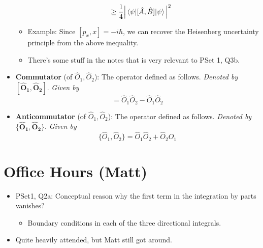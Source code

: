 \documentclass[../notes.tex]{subfiles}
\begin{document}
\begin{itemize}
\begin{itemize}
\begin{align*}
            &\geq \frac{1}{4}\Big| \ev{[\hat{A},\hat{B}]}{\psi} \Big|^2
        \end{align*}
        \item Example: Since $[p_x,x]=-i\hbar$, we can recover the Heisenberg uncertainty principle from the above inequality.
        \item There's some stuff in the notes that is very relevant to PSet 1, Q3b.
    \end{itemize}
    \item \textbf{Commutator} (of $\hat{O}_1,\hat{O}_2$): The operator defined as follows. \emph{Denoted by} $\bm{[\hat{O}_1,\hat{O}_2]}$. \emph{Given by}
    \begin{equation*}
        [\hat{O}_1,\hat{O}_2] = \hat{O}_1\hat{O}_2-\hat{O}_1\hat{O}_2
    \end{equation*}
    \item \textbf{Anticommutator} (of $\hat{O}_1,\hat{O}_2$): The operator defined as follows. \emph{Denoted by} $\bm{\{\hat{O}_1,\hat{O}_2\}}$. \emph{Given by}
    \begin{equation*}
        \{\hat{O}_1,\hat{O}_2\} = \hat{O}_1\hat{O}_2+\hat{O}_2\hat{O}_1
    \end{equation*}
\end{itemize}



\section{Office Hours (Matt)}
\begin{itemize}
    \item PSet1, Q2a: Conceptual reason why the first term in the integration by parts vanishes?
    \begin{itemize}
        \item Boundary conditions in each of the three directional integrals.
    \end{itemize}
    \item Quite heavily attended, but Matt still got around.
\end{itemize}
\end{document}

